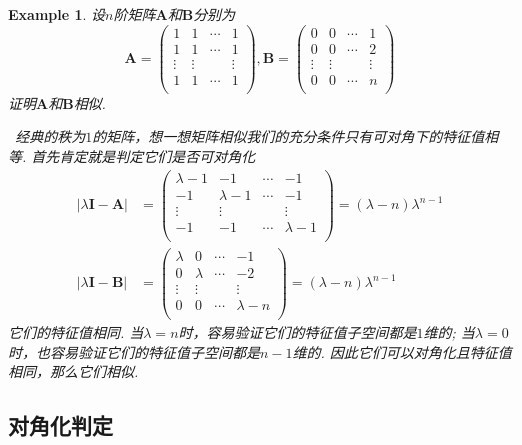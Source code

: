 \documentclass{article}
\newtheorem{example}[theorem]{Example}
\newcommand{\hints}{{\color{blue} \text{hints}}}
\newcommand{\mbf}[1]{\bm{#1}}
\begin{document}
\begin{example}
\rm 设$n$阶矩阵$\mbf{A}$和$\mbf{B}$分别为
$$
\mbf{A} = \begin{pmatrix}
1 & 1 & \cdots & 1 \\
1 & 1 & \cdots & 1 \\
\vdots & \vdots &  & \vdots \\
1 & 1 & \cdots & 1 \\
\end{pmatrix},
\mbf{B} = \begin{pmatrix}
0 & 0 & \cdots & 1 \\
0 & 0 & \cdots & 2 \\
\vdots & \vdots &  & \vdots \\
0 & 0 & \cdots & n \\
\end{pmatrix} 
$$
证明$\mbf{A}$和$\mbf{B}$相似. 

\hints\ 经典的秩为$1$的矩阵，想一想矩阵相似我们的充分条件只有可对角下的特征值相等. 首先肯定就是判定它们是否可对角化
$$
\begin{aligned}
|\lambda\mbf{I}-\mbf{A}| &= \begin{pmatrix}
\lambda-1 & -1 & \cdots & -1 \\
-1 & \lambda-1 & \cdots & -1 \\
\vdots & \vdots &  & \vdots \\
-1 & -1 & \cdots & \lambda-1 \\
\end{pmatrix} = (\lambda-n)\lambda^{n-1} \\
|\lambda\mbf{I}-\mbf{B}| &= \begin{pmatrix}
\lambda & 0 & \cdots & -1 \\
0 & \lambda & \cdots & -2 \\
\vdots & \vdots &  & \vdots \\
0 & 0 & \cdots & \lambda-n \\
\end{pmatrix} = (\lambda-n)\lambda^{n-1}
\end{aligned}
$$
它们的特征值相同. 当$\lambda=n$时，容易验证它们的特征值子空间都是$1$维的; 当$\lambda=0$时，也容易验证它们的特征值子空间都是$n-1$维的. 因此它们可以对角化且特征值相同，那么它们相似. 
\end{example}

\subsection{对角化判定}
\end{document}
